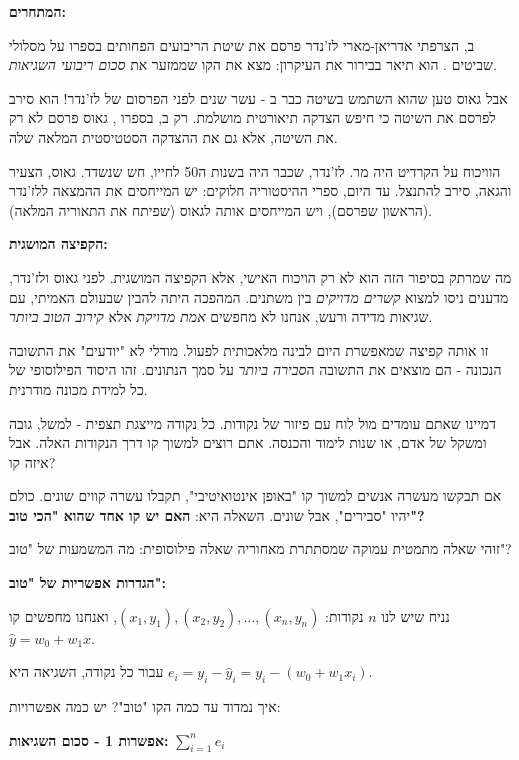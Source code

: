 \textbf{המתחרים:}

ב\en{-}, הצרפתי אדריאן-מארי לז'נדר  פרסם את שיטת הריבועים הפחותים בספרו על מסלולי שביטים \cite{legendre1805}. הוא תיאר בבירור את העיקרון: מצא את הקו שממזער את \textit{סכום ריבועי השגיאות}.

אבל גאוס טען שהוא השתמש בשיטה כבר ב\en{-} - עשר שנים לפני הפרסום של לז'נדר! הוא סירב לפרסם את השיטה כי חיפש הצדקה תיאורטית מושלמת. רק ב\en{-}, בספרו  \cite{gauss1809}, גאוס פרסם לא רק את השיטה, אלא גם את ההצדקה הסטטיסטית המלאה שלה.

הוויכוח על הקרדיט היה מר. לז'נדר, שכבר היה בשנות ה\en{-}\num{50} לחייו, חש שנשדד. גאוס, הצעיר והגאה, סירב להתנצל. עד היום, ספרי ההיסטוריה חלוקים: יש המייחסים את ההמצאה ללז'נדר (הראשון שפרסם), ויש המייחסים אותה לגאוס (שפיתח את התאוריה המלאה).

\textbf{הקפיצה המושגית:}

מה שמרתק בסיפור הזה הוא לא רק הויכוח האישי, אלא הקפיצה המושגית. לפני גאוס ולז'נדר, מדענים ניסו למצוא \textit{קשרים מדויקים} בין משתנים. המהפכה היתה להבין שבעולם האמיתי, עם שגיאות מדידה ורעש, אנחנו לא מחפשים \textit{אמת מדויקת} אלא \textit{קירוב הטוב ביותר}.

זו אותה קפיצה שמאפשרת היום לבינה מלאכותית לפעול. מודלי  לא "יודעים" את התשובה הנכונה - הם מוצאים את התשובה ה\textit{סבירה ביותר} על סמך הנתונים. זהו היסוד הפילוסופי של כל למידת מכונה מודרנית.


דמיינו שאתם עומדים מול לוח עם פיזור של נקודות. כל נקודה מייצגת תצפית - למשל, גובה ומשקל של אדם, או שנות לימוד והכנסה. אתם רוצים למשוך קו דרך הנקודות האלה. אבל איזה קו?

אם תבקשו מעשרה אנשים למשוך קו "באופן אינטואיטיבי", תקבלו עשרה קווים שונים. כולם יהיו "סבירים", אבל שונים. השאלה היא: \textbf{האם יש קו אחד שהוא "הכי טוב"?}

זוהי שאלה מתמטית עמוקה שמסתתרת מאחוריה שאלה פילוסופית: מה המשמעות של "טוב"?

\textbf{הגדרות אפשריות של "טוב":}

נניח שיש לנו $n$ נקודות: $(x_1, y_1), (x_2, y_2), \ldots, (x_n, y_n)$, ואנחנו מחפשים קו $\hat{y} = w_0 + w_1 x$.

עבור כל נקודה, השגיאה היא $e_i = y_i - \hat{y}_i = y_i - (w_0 + w_1 x_i)$.

איך נמדוד עד כמה הקו "טוב"? יש כמה אפשרויות:

\textbf{אפשרות \num{1} - סכום השגיאות:} $\sum_{i=1}^{n} e_i$

